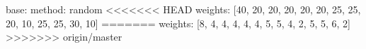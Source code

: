 base:
  method: random
<<<<<<< HEAD
  weights: [40, 20, 20, 20, 20, 20, 25, 25, 20, 10, 25, 25, 30, 10]
=======
  weights: [8, 4, 4, 4, 4, 4, 5, 5, 4, 2, 5, 5, 6, 2]
>>>>>>> origin/master
